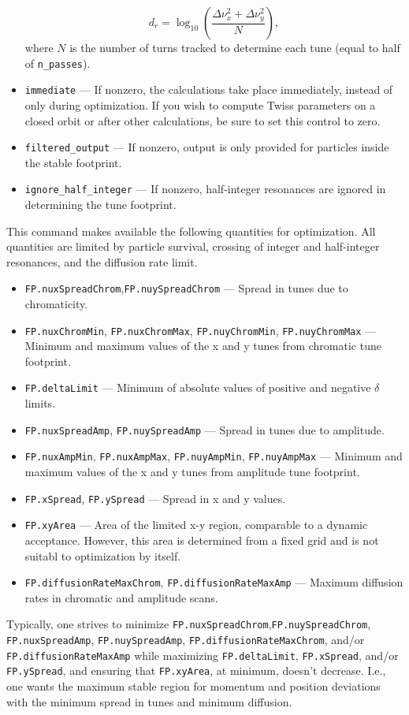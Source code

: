 \documentclass[11pt]{article}
\begin{document}
\begin{itemize}
\begin{equation}
  d_r = \log_{10} \left(\frac{\Delta\nu_x^2 + \Delta\nu_y^2}{N}\right),
\end{equation}
where $N$ is the number of turns tracked to determine each tune (equal to half of \verb|n_passes|).
\item \verb|immediate| --- If nonzero, the calculations take place immediately, instead of only during optimization.
  If you wish to compute Twiss parameters on a closed orbit or after other calculations, be sure to set this control to zero.
\item \verb|filtered_output| --- If nonzero, output is only provided for particles inside the stable footprint.
\item \verb|ignore_half_integer| --- If nonzero, half-integer resonances are ignored in determining the tune footprint.
\end{itemize}

This command makes available the following quantities for optimization. All quantities are limited by 
particle survival, crossing of integer and half-integer resonances,  and the diffusion rate limit.
\begin{itemize}
\item \verb|FP.nuxSpreadChrom|,\verb|FP.nuySpreadChrom| --- Spread in tunes due to chromaticity.
\item \verb|FP.nuxChromMin|, \verb|FP.nuxChromMax|, \verb|FP.nuyChromMin|, \verb|FP.nuyChromMax| --- Minimum and maximum
  values of the x and y tunes from chromatic tune footprint.
\item \verb|FP.deltaLimit| --- Minimum of absolute values of positive and negative $\delta$ limits. 
\item \verb|FP.nuxSpreadAmp|, \verb|FP.nuySpreadAmp| --- Spread in tunes due to amplitude.
\item \verb|FP.nuxAmpMin|, \verb|FP.nuxAmpMax|, \verb|FP.nuyAmpMin|, \verb|FP.nuyAmpMax| --- Minimum and maximum
  values of the x and y tunes from amplitude tune footprint.
\item \verb|FP.xSpread|, \verb|FP.ySpread| --- Spread in x and y values.
\item \verb|FP.xyArea| --- Area of the limited x-y region, comparable to a dynamic acceptance. However, this area is determined from a
fixed grid and is not suitabl to optimization by itself.
\item \verb|FP.diffusionRateMaxChrom|, \verb|FP.diffusionRateMaxAmp| --- Maximum diffusion rates in chromatic and amplitude scans.
\end{itemize}
Typically, one strives to minimize \verb|FP.nuxSpreadChrom|,\verb|FP.nuySpreadChrom|, 
\verb|FP.nuxSpreadAmp|, \verb|FP.nuySpreadAmp|, \verb|FP.diffusionRateMaxChrom|, 
and/or \verb|FP.diffusionRateMaxAmp| 
while maximizing \verb|FP.deltaLimit|, \verb|FP.xSpread|, and/or \verb|FP.ySpread|,  and
ensuring that \verb|FP.xyArea|, at minimum, doesn't decrease.
I.e., one wants the maximum stable region for momentum and position deviations with the minimum spread in tunes and minimum diffusion.
\end{document}
